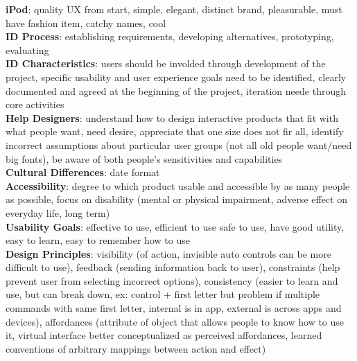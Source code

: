 \documentclass[a4paper]{article}
\begin{document}
\begin{multicols}{2}
        \textbf{iPod}: quality UX from start, simple, elegant, distinct brand, pleasurable, must have fashion item, catchy names, cool\\
        \textbf{ID Process}: establishing requirements, developing alternatives, prototyping, evaluating\\
        \textbf{ID Characteristics}: users should be involded through development of the project, specific usability and user experience goals need to be identified, clearly documented and agreed at the beginning of the project, iteration neede through core activities\\
        \textbf{Help Designers}: understand how to design interactive products that fit with what people want, need desire, appreciate that one size does not fir all, identify incorrect assumptions about particular user groups (not all old people want/need big fonts), be aware of both people's sensitivities and capabilities\\
        \textbf{Cultural Differences}: date format\\
        \textbf{Accessibility}: degree to which product usable and accessible by as many people as possible, focus on disability (mental or physical impairment, adverse effect on everyday life, long term)\\
        \textbf{Usability Goals}: effective to use, efficient to use safe to use, have good utility, easy to learn, easy to remember how to use\\
        \textbf{Design Principles}: visibility (of action, invisible auto controls can be more difficult to use), feedback (sending information back to user), constraints (help prevent user from selecting incorrect options), consistency (easier to learn and use, but can break down, ex: control + first letter but problem if multiple commands with same first letter, internal is in app, external is across apps and devices), affordances (attribute of object that allows people to know how to use it, virtual interface better conceptualized as perceived affordances, learned conventions of arbitrary mappings between action and effect)\\
    \end{multicols}
    
\end{document}
